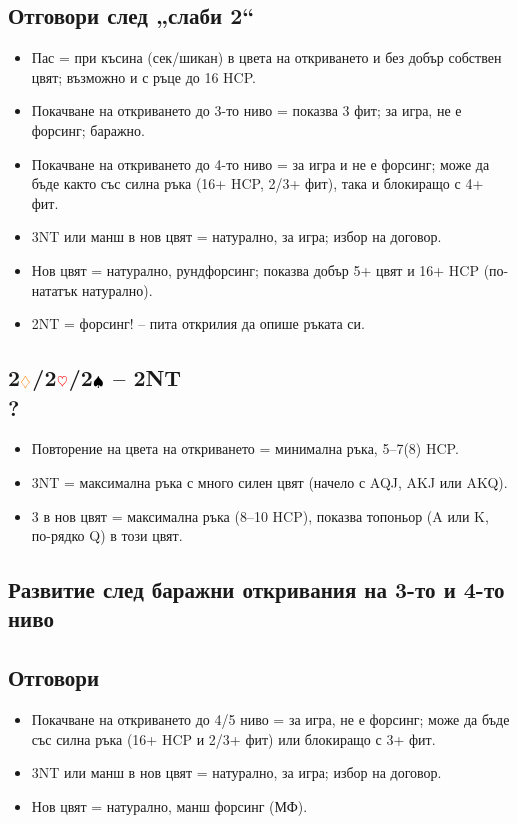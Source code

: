 \documentclass[10pt,a5paper]{extarticle}
\newcommand{\Rheart}{\textcolor{red}{\heartsuit}}
\newcommand{\Rdiamond}{\textcolor{orange}{\diamondsuit}}
\newcommand{\Bspade}{\textcolor{black}{\spadesuit}}
\begin{document}
\subsection*{Отговори след „слаби 2“}
\begin{itemize}
    \item Пас = при късина (сек/шикан) в цвета на откриването и без добър собствен цвят; възможно и с ръце до 16 HCP.
    \item Покачване на откриването до 3-то ниво = показва 3 фит; за игра, не е форсинг; баражно.
    \item Покачване на откриването до 4-то ниво = за игра и не е форсинг; може да бъде както със силна ръка (16+ HCP, 2/3+ фит), така и блокиращо с 4+ фит.
    \item 3NT или манш в нов цвят = натурално, за игра; избор на договор.
    \item Нов цвят = натурално, рундфорсинг; показва добър 5+ цвят и 16+ HCP (по-нататък натурално).
    \item 2NT = форсинг! – пита открилия да опише ръката си.
\end{itemize}


\subsection*{2$\Rdiamond$/2$\Rheart$/2$\Bspade$ – 2NT\\?}
\begin{itemize}
    \item Повторение на цвета на откриването = минимална ръка, 5–7(8) HCP.
    \item 3NT = максимална ръка с много силен цвят  
        (начело с AQJ, AKJ или AKQ).
    \item 3 в нов цвят = максимална ръка (8–10 HCP), показва топоньор  
        (A или K, по-рядко Q) в този цвят.
\end{itemize}

\subsection*{Развитие след баражни откривания на 3-то и 4-то ниво}

\subsection*{Отговори}
\begin{itemize}
    \item Покачване на откриването до 4/5 ниво = за игра, не е форсинг;  
        може да бъде със силна ръка (16+ HCP и 2/3+ фит) или блокиращо с 3+ фит.
    \item 3NT или манш в нов цвят = натурално, за игра; избор на договор.
    \item Нов цвят = натурално, манш форсинг (МФ).
\end{itemize}
\end{document}
